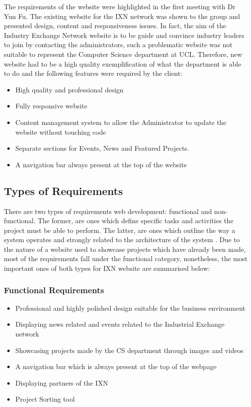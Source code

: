\documentclass[fontsize=10pt]{extarticle}
\numberwithin{figure}{section} %
\providecommand{\tightlist}{%
  \setlength{\itemsep}{0pt}\setlength{\parskip}{0pt}}
\begin{document}
The requirements of the website were highlighted in the first meeting
with Dr Yun Fu. The existing website for the IXN network was shown to
the group and presented design, content and responsiveness issues. In
fact, the aim of the Industry Exchange Network website is to be guide
and convince industry leaders to join by contacting the administrators,
such a problematic website was not suitable to represent the Computer
Science department at UCL. Therefore, new website had to be a high
quality exemplification of what the department is able to do and the
following features were required by the client:

\begin{itemize}
\tightlist
\item
  High quality and professional design
\item
  Fully responsive website
\item
  Content management system to allow the Administrator to update the
  website without touching code
\item
  Separate sections for Events, News and Featured Projects.
\item
  A navigation bar always present at the top of the website
\end{itemize}

\hypertarget{types-of-requirements}{%
\subsection{Types of Requirements}\label{types-of-requirements}}

There are two types of requirements web development: functional and
non-functional. The former, are ones which define specific tasks and
activities the project must be able to perform. The latter, are ones
which outline the way a system operates and strongly related to the
architecture of the system \cite{g5}. Due to the nature of a website
used to showcase projects which have already been made, most of the
requirements fall under the functional category, nonetheless, the most
important ones of both types for IXN website are summarised below:

\hypertarget{functional-requirements}{%
\subsubsection{Functional Requirements}\label{functional-requirements}}

\begin{itemize}
\tightlist
\item
  Professional and highly polished design suitable for the business
  environment
\item
  Displaying news related and events related to the Industrial Exchange
  network
\item
  Showcasing projects made by the CS department through images and
  videos
\item
  A navigation bar which is always present at the top of the webpage
\item
  Displaying partners of the IXN
\item
  Project Sorting tool
\end{itemize}
\end{document}
